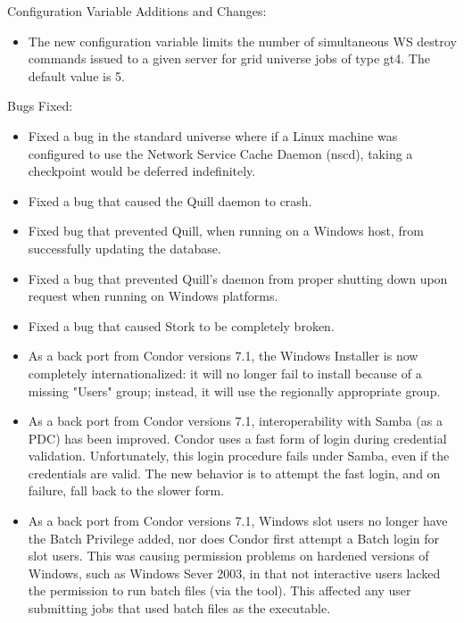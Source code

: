 \noindent Configuration Variable Additions and Changes:

\begin{itemize}

\item The new configuration variable
 limits the number
of simultaneous WS destroy commands issued to a given server for grid
universe jobs of type gt4. The default value is 5.

\end{itemize}

\noindent Bugs Fixed:

\begin{itemize}

\item Fixed a bug in the standard universe where if a Linux machine was
  configured to use the Network Service Cache Daemon (nscd), taking
  a checkpoint would be deferred indefinitely.

\item Fixed a bug that caused the Quill daemon to crash.

\item Fixed bug that prevented Quill, when running on a
  Windows host, from successfully updating the database.

\item Fixed a bug that prevented Quill's  daemon from proper
  shutting down upon request when running on Windows platforms.

\item Fixed a bug that caused Stork to be completely broken.

\item As a back port from Condor versions 7.1,
  the Windows Installer is now completely
  internationalized: it will no longer fail to install because of a
  missing "Users" group; instead, it will use the regionally appropriate
  group.

\item As a back port from Condor versions 7.1,
  interoperability with Samba (as a PDC) has been improved.
  Condor uses a fast form of login during credential validation.
  Unfortunately, this login procedure fails under Samba,
  even if the credentials are valid.  The new behavior is to attempt
  the fast login, and on failure, fall back to the slower form.

\item As a back port from Condor versions 7.1,
  Windows slot users no longer have the
  Batch Privilege added, nor does Condor first attempt a Batch login
  for slot users.  This was causing permission problems on hardened
  versions of Windows, such as Windows Sever 2003, in that not
  interactive users lacked the permission to run batch files 
  (via the  tool). 
  This affected any user submitting jobs that used
  batch files as the executable.


\end{itemize}
